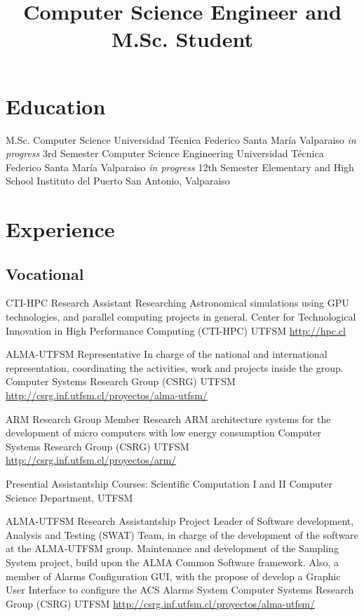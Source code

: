 \documentclass[11pt,a4paper]{moderncv}
\title{\large Computer Science Engineer and M.Sc. Student}               %
\begin{document}
\maketitle

\section{Education}
	{M.Sc. Computer Science}
	{Universidad Técnica Federico Santa María}
	{Valparaiso}
	{\emph{in progress}}
	{3rd Semester}
	{Computer Science Engineering}
	{Universidad Técnica Federico Santa María}
	{Valparaiso}
	{\emph{in progress}}
	{12th Semester}
	{Elementary and High School}
	{Instituto del Puerto}
	{San Antonio, Valparaiso}
	{}{}

\vspace{-0.5cm}
\section{Experience}
\subsection{Vocational}

    {CTI-HPC Research Assistant}
    {Researching Astronomical simulations using GPU technologies, and parallel computing projects in general.}
    {Center for Technological Innovation in High Performance Computing (CTI-HPC)}
    {UTFSM}
    {\url{http://hpc.cl}}

	{ALMA-UTFSM Representative}
	{In charge of the national and international representation, coordinating the activities, work and projects inside the group.}
	{Computer Systems Research Group (CSRG)}
	{UTFSM}
	{\url{http://csrg.inf.utfsm.cl/proyectos/alma-utfsm/}}

	{ARM Research Group Member}
	{Research ARM architecture systems for the development of micro computers with low energy consumption}
	{Computer Systems Research Group (CSRG)}
	{UTFSM}
	{\url{http://csrg.inf.utfsm.cl/proyectos/arm/}}

	{Presential Assistantship}
	{Courses: Scientific Computation I and II}
	{Computer Science Department, UTFSM}
	{}{}

	{ALMA-UTFSM Research Assistantship}
	{Project Leader of Software development, Analysis and Testing (SWAT) Team, in charge of the development of the software at the ALMA-UTFSM group. 
	Maintenance and development of the Sampling System project, build upon the ALMA Common Software framework.
	Also, a member of Alarms Configuration GUI, with the propose of develop a Graphic User Interface to configure the ACS Alarms System}
	{Computer Systems Research Group (CSRG)}
	{UTFSM}
	{\url{http://csrg.inf.utfsm.cl/proyectos/alma-utfsm/}}
\end{document}
